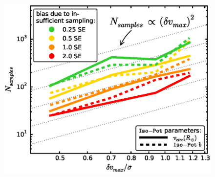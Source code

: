 \documentclass[iop,revtex4]{emulateapj}
\begin{document}
\begin{figure}[!htbp]
\centering
\includegraphics[width=\columnwidth]{figs/isoSphFlexErrConv_MC_vs_error_3.eps}

\end{figure}
\end{document}
